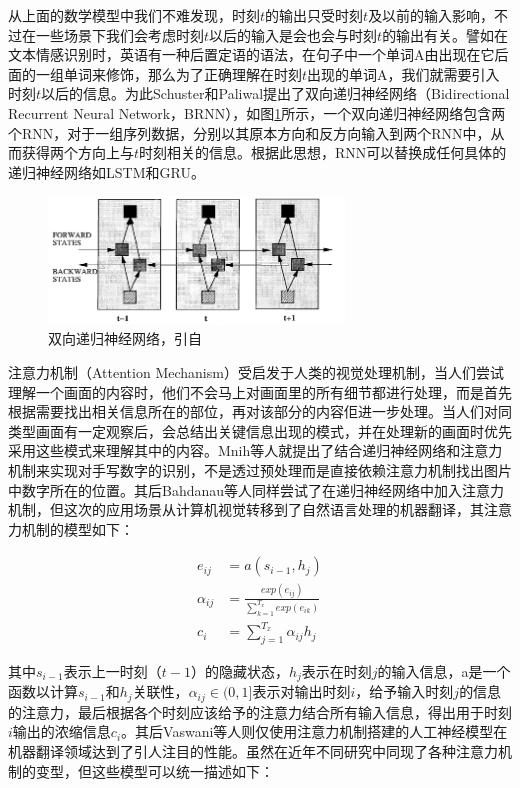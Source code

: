 从上面的数学模型中我们不难发现，时刻$t$的输出只受时刻$t$及以前的输入影响，不过在一些场景下我们会考虑时刻$t$以后的输入是会也会与时刻$t$的输出有关。譬如在文本情感识别时，英语有一种后置定语的语法，在句子中一个单词A由出现在它后面的一组单词来修饰，那么为了正确理解在时刻$t$出现的单词A，我们就需要引入时刻$t$以后的信息。为此Schuster和Paliwal\cite{schuster1997bidirectional}提出了双向递归神经网络（Bidirectional Recurrent Neural Network，BRNN），如图\ref{fig:brnn}所示，一个双向递归神经网络包含两个RNN，对于一组序列数据，分别以其原本方向和反方向输入到两个RNN中，从而获得两个方向上与$t$时刻相关的信息。根据此思想，RNN可以替换成任何具体的递归神经网络如LSTM和GRU。

\begin{figure}[H]
  \centering
  \includegraphics[width=0.7\textwidth]{img/brnn.png}
  \caption{双向递归神经网络，引自\cite{schuster1997bidirectional}}
  \label{fig:brnn}
\end{figure}

注意力机制（Attention Mechanism）受启发于人类的视觉处理机制，当人们尝试理解一个画面的内容时，他们不会马上对画面里的所有细节都进行处理，而是首先根据需要找出相关信息所在的部位，再对该部分的内容佢进一步处理。当人们对同类型画面有一定观察后，会总结出关键信息出现的模式，并在处理新的画面时优先采用这些模式来理解其中的内容。Mnih等人\cite{mnih2014recurrent}就提出了结合递归神经网络和注意力机制来实现对手写数字的识别，不是透过预处理而是直接依赖注意力机制找出图片中数字所在的位置。其后Bahdanau等人\cite{bahdanau2014neural}同样尝试了在递归神经网络中加入注意力机制，但这次的应用场景从计算机视觉转移到了自然语言处理的机器翻译，其注意力机制的模型如下：

\begin{align}
  \label{eq:attention}
  e_{ij} &= a(s_{i - 1}, h_j) \\
  \alpha_{ij} &= \frac{exp(e_{ij})}{\sum\limits_{k=1}^{T_x}{exp(e_{ik})}} \\
  c_{i} &= \sum\limits_{j=1}^{T_x}{\alpha_{ij}h_j}
\end{align}

其中$s_{i-1}$表示上一时刻（$t-1$）的隐藏状态，$h_j$表示在时刻$j$的输入信息，a是一个函数以计算$s_{i - 1}$和$h_j$关联性，$\alpha_{ij} \in (0, 1]$表示对输出时刻$i$，给予输入时刻$j$的信息的注意力，最后根据各个时刻应该给予的注意力结合所有输入信息，得出用于时刻$i$输出的浓缩信息$c_{i}$。其后Vaswani等人\cite{vaswani2017attention}则仅使用注意力机制搭建的人工神经模型在机器翻译领域达到了引人注目的性能。虽然在近年不同研究\cite{luong2015effective}\cite{graves2014neural}\cite{xu2015show}中同现了各种注意力机制的变型，但这些模型可以统一描述如下：

